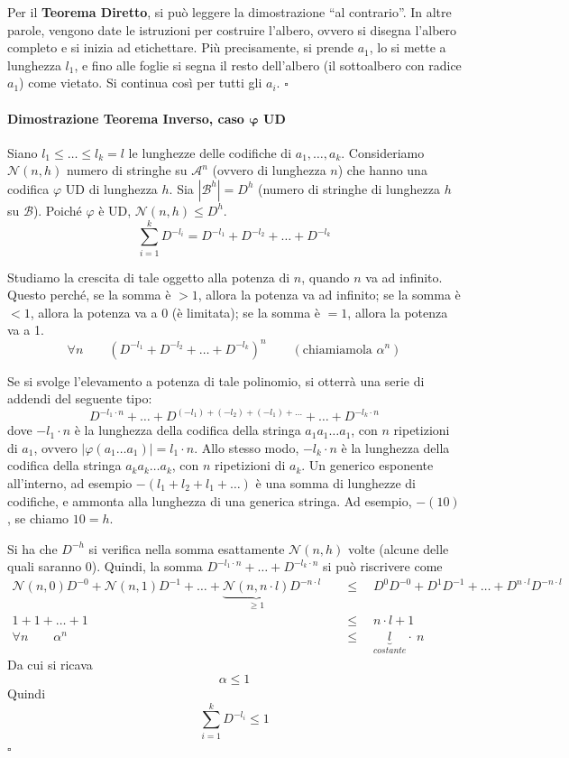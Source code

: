 Per il \textbf{Teorema Diretto}, si può leggere la dimostrazione ``al contrario''. In altre parole, vengono date le istruzioni per costruire l'albero, ovvero si disegna l'albero completo e si inizia ad etichettare. Più precisamente, si prende $a_1$, lo si mette a lunghezza $l_1$, e fino alle foglie si segna il resto dell'albero (il sottoalbero con radice $a_1$) come vietato. Si continua così per tutti gli $a_i$. \hfill $\square$

\paragraph{Dimostrazione Teorema Inverso, caso $\bm{\varphi}$ UD} Siano $l_1\leq\dots\leq l_k=l$ le lunghezze delle codifiche di $a_1,\dots,a_k$. Consideriamo $\mathcal{N}(n,h)$ numero di stringhe su $\mathcal{A}^n$ (ovvero di lunghezza $n$) che hanno una codifica $\varphi$ UD di lunghezza $h$. Sia $|\mathcal{B}^h|=D^h$ (numero di stringhe di lunghezza $h$ su $\mathcal{B}$). Poiché $\varphi$ è UD, $\mathcal{N}(n,h)\leq D^h$.
$$
    \sum_{i=1}^k D^{-l_i} = D^{-l_1} + D^{-l_2} + \dots + D^{-l_k} 
$$

Studiamo la crescita di tale oggetto alla potenza di $n$, quando $n$ va ad infinito. Questo perché, se la somma è $>1$, allora la potenza va ad infinito; se la somma è $<1$, allora la potenza va a 0 (è limitata); se la somma è $=1$, allora la potenza va a 1.
$$
    \forall n \qquad \left(D^{-l_1} + D^{-l_2} + \dots + D^{-l_k}\right)^n \qquad (\text{chiamiamola }\alpha^n)
$$

Se si svolge l'elevamento a potenza di tale polinomio, si otterrà una serie di addendi del seguente tipo:
$$
    D^{-l_1\cdot n} +
    \dots +
    D^{(-l_1)+(-l_2)+(-l_1)+\dots} +
    \dots +
    D^{-l_k\cdot n}
$$
dove $-l_1\cdot n$ è la lunghezza della codifica della stringa $a_1a_1\dots a_1$, con $n$ ripetizioni di $a_1$, ovvero $|\varphi(a_1\dots a_1)|=l_1\cdot n$. Allo stesso modo, $-l_k\cdot n$ è la lunghezza della codifica della stringa $a_ka_k\dots a_k$, con $n$ ripetizioni di $a_k$. Un generico esponente all'interno, ad esempio $-(l_1+l_2+l_1+\dots)$ è una somma di lunghezze di codifiche, e ammonta alla lunghezza di una generica stringa. Ad esempio, $-(10)$, se chiamo $10=h$.

Si ha che $D^{-h}$ si verifica nella somma esattamente $\mathcal{N}(n,h)$ volte (alcune delle quali saranno 0). Quindi, la somma $D^{-l_1\cdot n}+\dots+D^{-l_k\cdot n}$ si può riscrivere come 
\begin{align*}
    \mathcal{N}(n,0)D^{-0} + \mathcal{N}(n,1)D^{-1} + \dots + \underbrace{\mathcal{N}(n,n\cdot l)}_{\geq 1}D^{-n\cdot l} & \quad\leq\quad
    D^0D^{-0} + D^1D^{-1} + \dots + D^{n\cdot l}D^{-n\cdot l}\\
    1+1+\dots+1 & \quad\leq\quad n\cdot l + 1\\
    \forall n \qquad \alpha^n &\quad\leq\quad \underbrace{l}_{costante}\cdot~ n
\end{align*}
Da cui si ricava
$$
    \alpha \leq 1
$$
Quindi
$$
    \sum_{i=1}^k D^{-l_i} \leq 1
$$
\hfill $\square$



